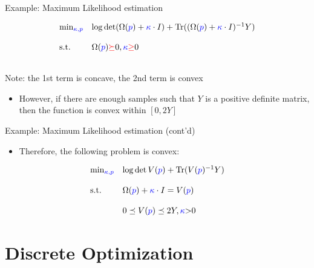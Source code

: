 \documentclass[
  ignorenonframetext,
  aspectratio=169,
  serif,onlymath]{beamer}
\providecommand{\tightlist}{%
  \setlength{\itemsep}{0pt}\setlength{\parskip}{0pt}}
\begin{document}
\begin{frame}{Example: Maximum Likelihood estimation}
\protect\hypertarget{example-maximum-likelihood-estimation}{}

\[\begin{array}{ll}
      \min_{\color{blue}\kappa, p}   &      \log \det (\Omega({\color{blue}p}) + {\color{blue}\kappa}
       \cdot I) + \mathrm{Tr}((\Omega({\color{blue}p}) + {\color{blue}\kappa} \cdot I)^{-1}Y) \\\\
      \text{s.t.} & \Omega({\color{blue}p}) {\color{red}\succeq} 0, {\color{blue}\kappa} {\color{red}\geq} 0 \\\\
 \end{array}\]

Note: the 1st term is concave, the 2nd term is convex

\begin{itemize}
\tightlist
\item
  However, if there are enough samples such that \(Y\) is a positive
  definite matrix, then the function is convex within \([0, 2Y]\)
\end{itemize}

\end{frame}

\begin{frame}{Example: Maximum Likelihood estimation (cont'd)}
\protect\hypertarget{example-maximum-likelihood-estimation-contd}{}

\begin{itemize}
\tightlist
\item
  Therefore, the following problem is convex:
\end{itemize}

\[\begin{array}{ll}
      \min_{\color{blue}\kappa, p}   &   \log \det V({\color{blue}p}) + \mathrm{Tr}(V({\color{blue}p})^{-1}Y) \\\\
      \text{s.t.} & \Omega({\color{blue}p}) + {\color{blue}\kappa} \cdot I = V({\color{blue}p}) \\\\
                    & 0 \preceq V({\color{blue}p}) \preceq 2Y, {\color{blue}\kappa} {>} 0
\end{array}\]

\end{frame}

\hypertarget{discrete-optimization}{%
\section{Discrete Optimization}\label{discrete-optimization}}
\end{document}
